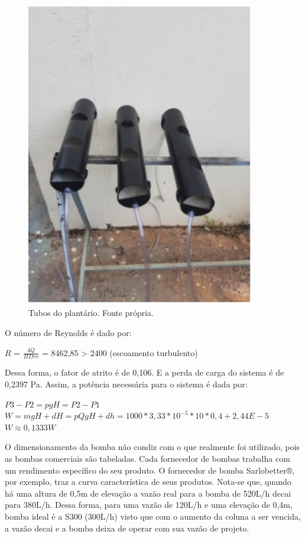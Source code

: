 \begin{figure}[H]
	\centering
	\includegraphics[width=10cm]{figuras/tubos_plantario.png}
	\caption{Tubos do plantário. Fonte própria.}
	\label{tubos_plantario}
\end{figure}

O número de Reynolds é dado por:

$R$ = $\frac{4Q}{\Pi Dr v}$ = 8462,85 > 2400 (escoamento turbulento)

Dessa forma, o fator de atrito é de 0,106. E a perda de carga do sistema é de 0,2397 Pa. Assim, a potência necessária para o sistema é dada por:

$P3 - P2 = pgH = P2 - P1$\\

$W = mgH + dH = pQgH + dh = 1000 * 3,33 * 10^{-5} * 10 * 0,4 + 2,44E - 5$\\

$W \approx 0,1333 W $

O dimensionamento da bomba não condiz com o que realmente foi utilizado, pois as bombas comerciais são tabeladas. Cada fornecedor de bombas trabalha com um rendimento específico do seu produto. O fornecedor de bomba Sarlobetter®, por exemplo, traz a curva característica de seus produtos. Nota-se que, quando há uma altura de 0,5m de elevação a vazão real para a bomba de 520L/h decai para 380L/h. Dessa forma, para uma vazão de 120L/h e uma elevação de 0,4m, bomba ideal é a S300 (300L/h) visto que com o aumento da coluna a ser vencida, a vazão decai e a bomba deixa de operar com sua vazão de projeto.  

